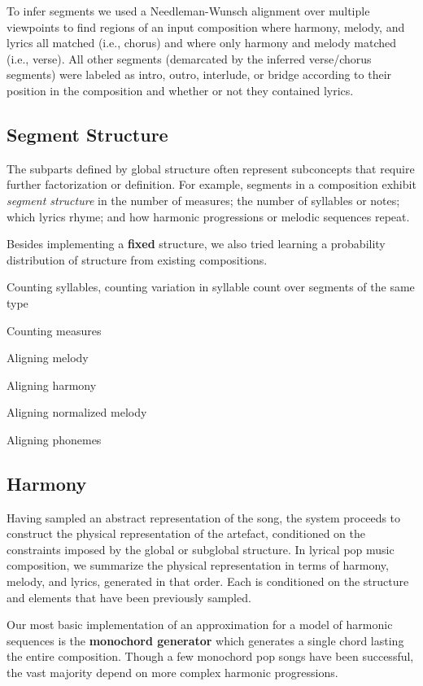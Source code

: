 \documentclass[letterpaper]{article}
\begin{document}
To infer segments we used a Needleman-Wunsch alignment over multiple viewpoints to find regions of an input composition where harmony, melody, and lyrics all matched (i.e., chorus) and where only harmony and melody matched (i.e., verse). All other segments (demarcated by the inferred verse/chorus segments) were labeled as intro, outro, interlude, or bridge according to their position in the composition and whether or not they contained lyrics.

\subsection{Segment Structure}

The subparts defined by global structure often represent subconcepts that require further factorization or definition. For example, segments in a composition exhibit \textit{segment structure} in the number of measures; the number of syllables or notes; which lyrics rhyme; and how harmonic progressions or melodic sequences repeat. 

Besides implementing a \textbf{fixed} structure, we also tried learning a probability distribution of structure from existing compositions. 

Counting syllables, counting variation in syllable count over segments of the same type

Counting measures

Aligning melody

Aligning harmony

Aligning normalized melody

Aligning phonemes

\subsection{Harmony}

Having sampled an abstract representation of the song, the system proceeds to construct the physical representation of the artefact, conditioned on the constraints imposed by the global or subglobal structure. In lyrical pop music composition, we summarize the physical representation in terms of harmony, melody, and lyrics, generated in that order. Each is conditioned on the structure and elements that have been previously sampled.

Our most basic implementation of an approximation for a model of harmonic sequences is the \textbf{monochord generator} which generates a single chord lasting the entire composition. Though a few monochord pop songs have been successful, the vast majority depend on more complex harmonic progressions. 
\end{document}
